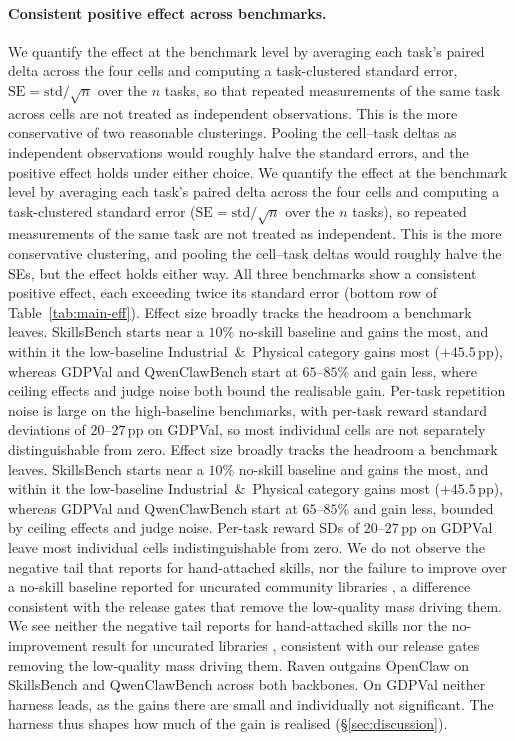 \paragraph{Consistent positive effect across benchmarks.}
\ifarxiv
We quantify the effect at the benchmark level by averaging each
task's paired delta across the four cells and computing a
task-clustered standard error, $\mathrm{SE}=\mathrm{std}/\sqrt{n}$
over the $n$ tasks, so that repeated measurements of the same task
across cells are not treated as independent observations.  This is
the more conservative of two reasonable clusterings.  Pooling the
cell--task deltas as independent observations would roughly halve
the standard errors, and the positive effect holds
under either choice.
\else
We quantify the effect at the benchmark level by averaging each
task's paired delta across the four cells and computing a
task-clustered standard error ($\mathrm{SE}=\mathrm{std}/\sqrt{n}$
over the $n$ tasks), so repeated measurements of the same task are
not treated as independent.  This is the more conservative
clustering, and pooling the cell--task deltas would roughly halve
the SEs, but the effect holds either way.
\fi
All
three benchmarks show a consistent positive effect, each
exceeding twice its standard error (bottom row of
Table~\ref{tab:main-eff}).
\ifarxiv
Effect size broadly tracks the headroom a benchmark leaves.
SkillsBench starts near a $10\%$ no-skill baseline and
gains the most, and within it the low-baseline
Industrial~\&~Physical category gains most ($+45.5$\,pp), whereas
GDPVal and QwenClawBench start at $65$--$85\%$ and gain less, where
ceiling effects and judge noise both bound the realisable gain.  Per-task repetition noise is large
on the high-baseline benchmarks, with per-task reward standard
deviations of $20$--$27$\,pp on GDPVal, so most individual cells
are not separately distinguishable from zero.
\else
Effect size broadly tracks the headroom a benchmark leaves.
SkillsBench starts near a $10\%$ no-skill baseline and gains the
most, and within it the low-baseline Industrial~\&~Physical
category gains most ($+45.5$\,pp), whereas GDPVal and QwenClawBench
start at $65$--$85\%$ and gain less, bounded by ceiling effects and
judge noise.  Per-task reward SDs of $20$--$27$\,pp on GDPVal leave
most individual cells indistinguishable from zero.
\fi  \ifarxiv
We do
not observe the negative tail that \citet{SkillsBench2026} reports
for hand-attached skills, nor the failure to improve over a
no-skill baseline reported for uncurated community libraries
\citep{SkillFlow2026,UCSBSkillsWild2026}, a difference consistent with the release gates that
remove the low-quality mass driving them.
\else
We see neither the negative tail \citet{SkillsBench2026} reports for
hand-attached skills nor the no-improvement result for uncurated
libraries \citep{SkillFlow2026,UCSBSkillsWild2026}, consistent with
our release gates removing the low-quality mass driving them.
\fi  Raven outgains OpenClaw on SkillsBench and QwenClawBench
across both backbones.  On GDPVal neither harness leads, as the
gains there are small and individually not significant.  The harness
thus shapes how much of the gain is realised
(\S\ref{sec:discussion}).

